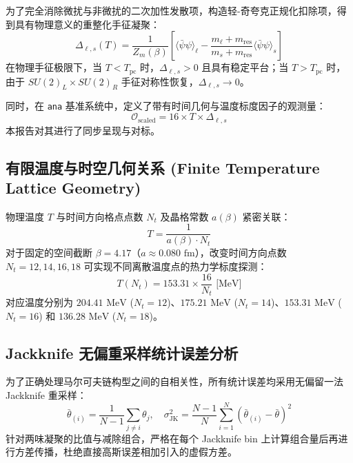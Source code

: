 \documentclass[11pt,a4paper]{ctexart}
\begin{document}
为了完全消除微扰与非微扰的二次加性发散项，构造轻-奇夸克正规化扣除项，得到具有物理意义的重整化手征凝聚：
\begin{equation}
\Delta_{\ell, s}(T) = \frac{1}{Z_m(\beta)} \left[ \langle\bar{\psi}\psi\rangle_\ell - \frac{m_\ell + m_{\text{res}}}{m_s + m_{\text{res}}} \langle\bar{\psi}\psi\rangle_s \right]
\label{eq:delta_ls}
\end{equation}
在物理手征极限下，当 $T < T_{\text{pc}}$ 时，$\Delta_{\ell, s} > 0$ 且具有稳定平台；当 $T > T_{\text{pc}}$ 时，由于 $SU(2)_L \times SU(2)_R$ 手征对称性恢复，$\Delta_{\ell, s} \to 0$。

同时，在 \texttt{ana} 基准系统中，定义了带有时间几何与温度标度因子的观测量：
\begin{equation}
\mathcal{O}_{\text{scaled}} = 16 \times T \times \Delta_{\ell, s}
\end{equation}
本报告对其进行了同步呈现与对标。

\subsection{有限温度与时空几何关系 (Finite Temperature Lattice Geometry)}

物理温度 $T$ 与时间方向格点点数 $N_t$ 及晶格常数 $a(\beta)$ 紧密关联：
\begin{equation}
T = \frac{1}{a(\beta) \cdot N_t}
\end{equation}
对于固定的空间截断 $\beta=4.17$（$a \approx 0.080\text{ fm}$），改变时间方向点数 $N_t = 12, 14, 16, 18$ 可实现不同离散温度点的热力学标度探测：
\begin{equation}
T(N_t) = 153.31 \times \frac{16}{N_t}\text{ [MeV]}
\end{equation}
对应温度分别为 $204.41\text{ MeV}$ ($N_t=12$)、$175.21\text{ MeV}$ ($N_t=14$)、$153.31\text{ MeV}$ ($N_t=16$) 和 $136.28\text{ MeV}$ ($N_t=18$)。

\subsection{Jackknife 无偏重采样统计误差分析}

为了正确处理马尔可夫链构型之间的自相关性，所有统计误差均采用无偏留一法 Jackknife 重采样：
\begin{equation}
\bar{\theta}_{(i)} = \frac{1}{N-1} \sum_{j \neq i} \theta_j, \quad \sigma_{\text{JK}}^2 = \frac{N-1}{N} \sum_{i=1}^N \left( \bar{\theta}_{(i)} - \bar{\theta} \right)^2
\end{equation}
针对两味凝聚的比值与减除组合，严格在每个 Jackknife bin 上计算组合量后再进行方差传播，杜绝直接高斯误差相加引入的虚假方差。
\end{document}
